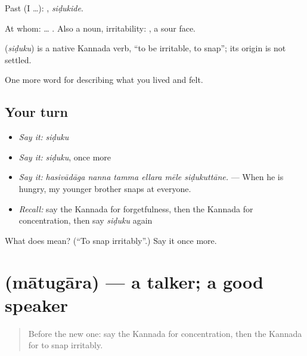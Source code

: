 Past (I …): , \emph{siḍukide}.

At whom: …  . Also a noun, irritability:  , a sour face.

\begin{cousinweb}
\textbf{} (\emph{siḍuku}) is a native Kannada verb, \textquotedblleft{}to be irritable, to snap\textquotedblright{}; its origin is not settled.
\end{cousinweb}

\begin{grammarlens}[title={What you've built}]
One more word for describing what you lived and felt.
\end{grammarlens}

\subsection*{Your turn}
\begin{itemize}
\raggedright
  \item \emph{Say it:} \emph{siḍuku}
  \item \emph{Say it:} \emph{siḍuku}, once more
  \item \emph{Say it:} \emph{hasivādāga nanna tamma ellara mēle siḍukuttāne.} — When he is hungry, my younger brother snaps at everyone.
  \item \emph{Recall:} say the Kannada for forgetfulness, then the Kannada for concentration, then say \emph{siḍuku} again
\end{itemize}

\begin{tcolorbox}[breakable,colback=teal!4,colframe=teal!35!black,title={Before you move on}]
What does  mean? (\textquotedblleft{}To snap irritably\textquotedblright{}.) Say it once more.
\end{tcolorbox}
\section[\texorpdfstring{\kn{ಮಾತುಗಾರ} (mātugāra)}{ಮಾತುಗಾರ (mātugāra)}]{ (mātugāra) — a talker; a good speaker}

\label{lesson:KA-C504-matugara}



\begin{quote}
Before the new one: say the Kannada for concentration, then the Kannada for to snap irritably.
\end{quote}


